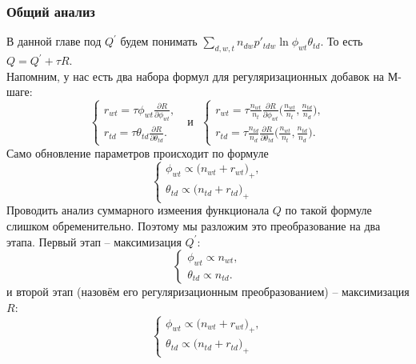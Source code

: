 \documentclass[12pt]{article}
\begin{document}
	\subsubsection{Общий анализ}
В данной главе под $Q^{\prime}$ будем понимать $\sum\limits_{d, w, t} n_{dw} p'_{tdw} \ln{\phi_{wt}\theta_{td}}$. То есть $Q = Q^{\prime} + \tau R$.\\
Напомним, у нас есть два набора формул для регуляризационных добавок на М-шаге:
\[
\left\{
	\begin{aligned}
		r_{wt}= \tau\phi_{wt} \frac{\partial{R}}{\partial{\phi_{wt}}},\\
		r_{td} = \tau\theta_{td} \frac{\partial{R}}{\partial{\theta_{td}}}.
	\end{aligned}
\right.
\text{~~и~~}
\left\{
	\begin{aligned}
		r_{wt} = \tau \frac{n_{wt}}{n_t} \frac{\partial{R}}{\partial{\phi_{wt}}} \biggl(\frac{n_{wt}}{n_t}, \frac{n_{td}}{n_d}\biggr),\\
		r_{td}= \tau \frac{n_{td}}{n_d} \frac{\partial{R}}{\partial{\theta_{td}}} \biggl(\frac{n_{wt}}{n_t}, \frac{n_{td}}{n_d}\biggr).
	\end{aligned}
\right.
\]
Само обновление параметров происходит по формуле 
\[
\left\{
\begin{aligned}
 \phi_{wt}  \propto \bigl(n_{wt} + r_{wt} \bigr)_{+},\\
\theta_{td} \propto  \bigl(n_{td} + r_{td}\bigr)_{+}
\end{aligned}
\right.
\]
Проводить анализ суммарного измеения функционала $Q$ по такой формуле слишком обременительно. Поэтому мы разложим это преобразование на два этапа. Первый этап -- максимизация $Q^{\prime}$:
\[
\left\{
	\begin{aligned}
		\phi_{wt} \propto n_{wt},\\
		\theta_{td} \propto n_{td} .
	\end{aligned}
\right.
\]
и второй этап (назовём его регуляризационным преобразованием) -- максимизация $R$:
\[
\left\{
\begin{aligned}
 \phi_{wt}  \propto \bigl(n_{wt} + r_{wt} \bigr)_{+},\\
\theta_{td} \propto  \bigl(n_{td} + r_{td}\bigr)_{+}
\end{aligned}
\right.
\]
\end{document}
